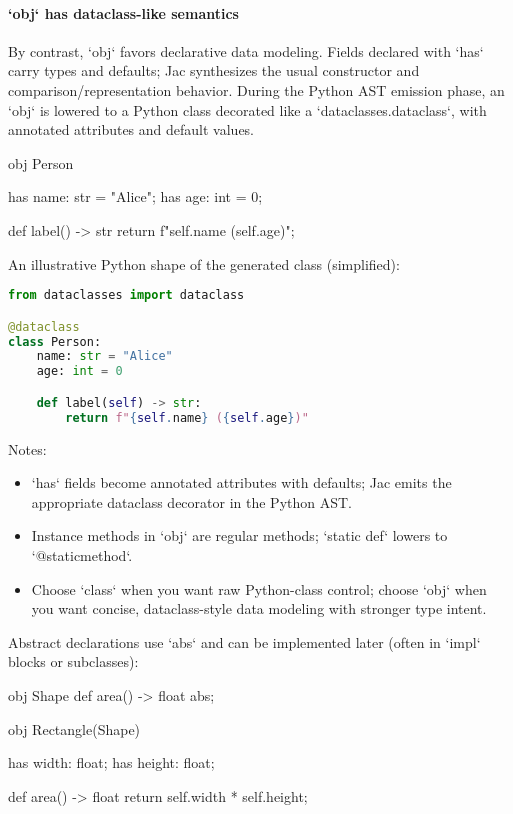 \paragraph{`obj` has dataclass-like semantics}

By contrast, `obj` favors declarative data modeling. Fields declared with `has` carry types and defaults; Jac synthesizes the usual constructor and comparison/representation behavior. During the Python AST emission phase, an `obj` is lowered to a Python class decorated like a `dataclasses.dataclass`, with annotated attributes and default values.

\begin{jacblock}
obj Person {
    has name: str = "Alice";
    has age: int = 0;

    def label() -> str { return f"{self.name} ({self.age})"; }
}
\end{jacblock}

An illustrative Python shape of the generated class (simplified):

\begin{lstlisting}[language=Python]
from dataclasses import dataclass

@dataclass
class Person:
    name: str = "Alice"
    age: int = 0

    def label(self) -> str:
        return f"{self.name} ({self.age})"
\end{lstlisting}

Notes:
\begin{itemize}
    \item `has` fields become annotated attributes with defaults; Jac emits the appropriate dataclass decorator in the Python AST.
    \item Instance methods in `obj` are regular methods; `static def` lowers to `@staticmethod`.
    \item Choose `class` when you want raw Python-class control; choose `obj` when you want concise, dataclass-style data modeling with stronger type intent.
\end{itemize}

Abstract declarations use `abs` and can be implemented later (often in `impl` blocks or subclasses):

\begin{jacblock}
obj Shape {
    def area() -> float abs;
}

obj Rectangle(Shape) {
    has width: float;
    has height: float;

    def area() -> float { return self.width * self.height; }
}
\end{jacblock}

